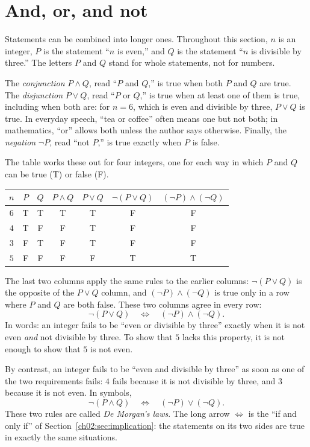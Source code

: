 \section{And, or, and not}\label{ch02:sec:connectives}
Statements can be combined into longer ones. Throughout this section, $n$ is an integer, $P$ is the statement ``$n$ is even,'' and $Q$ is the statement ``$n$ is divisible by three.'' The letters $P$ and $Q$ stand for whole statements, not for numbers.

The \emph{conjunction} $P\land Q$, read ``$P$ and $Q$,'' is true when both $P$ and $Q$ are true. The \emph{disjunction} $P\lor Q$, read ``$P$ or $Q$,'' is true when at least one of them is true, including when both are: for $n=6$, which is even and divisible by three, $P\lor Q$ is true. In everyday speech, ``tea or coffee'' often means one but not both; in mathematics, ``or'' allows both unless the author says otherwise. Finally, the \emph{negation} $\neg P$, read ``not $P$,'' is true exactly when $P$ is false.

The table works these out for four integers, one for each way in which $P$ and $Q$ can be true (T) or false (F).
\begin{center}
\begin{tabular}{@{}ccccccc@{}}
\toprule
$n$ & $P$ & $Q$ & $P\land Q$ & $P\lor Q$ & $\neg(P\lor Q)$ & $(\neg P)\land(\neg Q)$\\
\midrule
$6$ & T & T & T & T & F & F\\
$4$ & T & F & F & T & F & F\\
$3$ & F & T & F & T & F & F\\
$5$ & F & F & F & F & T & T\\
\bottomrule
\end{tabular}
\end{center}
The last two columns apply the same rules to the earlier columns: $\neg(P\lor Q)$ is the opposite of the $P\lor Q$ column, and $(\neg P)\land(\neg Q)$ is true only in a row where $P$ and $Q$ are both false. These two columns agree in every row:
\[
\neg(P\lor Q)\quad\Longleftrightarrow\quad (\neg P)\land(\neg Q).
\]
In words: an integer fails to be ``even or divisible by three'' exactly when it is not even \emph{and} not divisible by three. To show that $5$ lacks this property, it is not enough to show that $5$ is not even.

By contrast, an integer fails to be ``even and divisible by three'' as soon as one of the two requirements fails: $4$ fails because it is not divisible by three, and $3$ because it is not even. In symbols,
\[
\neg(P\land Q)\quad\Longleftrightarrow\quad (\neg P)\lor(\neg Q).
\]
These two rules are called \emph{De Morgan's laws}. The long arrow $\Longleftrightarrow$ is the ``if and only if'' of Section~\ref{ch02:sec:implication}: the statements on its two sides are true in exactly the same situations.

